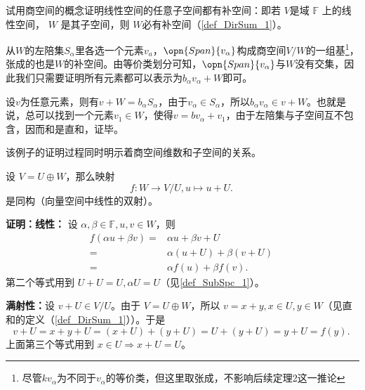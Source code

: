 \begin{example}{}%
试用商空间的概念证明线性空间的任意子空间都有补空间：即若 $V$是域 $\mathbb F$ 上的线性空间， $W$ 是其子空间，则 $W$必有补空间（\autoref{def_DirSum_1}）。

从$W$的左陪集${S_{\alpha}}$里各选一个元素$v_a$，$\opn{Span} \{v_{\alpha}\}$构成商空间$V/W$的一组基\footnote{尽管$kv_\alpha$为不同于$v_\alpha$的等价类，但这里取张成，不影响后续定理2这一推论}，张成的也是$W$的补空间。由等价类划分可知，$\opn{Span} \{v_{\alpha}\}$与$W$没有交集，因此我们只需要证明所有元素都可以表示为$b_{\alpha}v_{\alpha} + W$即可。

设$v$为任意元素，则有$v + W=b_{\alpha} S_{\alpha}$，由于$v_{\alpha} \in S_{\alpha}$，所以$b_{\alpha} v_{\alpha} \in v + W$。也就是说，总可以找到一个元素$v_1 \in W$，使得$v=bv_{\alpha} + v_1$，由于左陪集与子空间互不包含，因而和是直和，证毕。

该例子的证明过程同时明示着商空间维数和子空间的关系。
\end{example}



\begin{theorem}{}\label{the_QuoSpa_3}
设 $V=U\oplus W$，那么映射 
\begin{equation}
f:W\rightarrow V/U, u\mapsto u+U.~  
\end{equation}
是同构（向量空间中线性的双射）。
\end{theorem}

\textbf{证明：}\textbf{线性：} 设 $\alpha,\beta\in\mathbb F,u,v\in W$，则
\begin{equation}
\begin{aligned}
f(\alpha u+\beta v)=&\alpha u+\beta v+U\\
=&\alpha (u+U)+\beta(v+U)\\
=&\alpha f(u)+\beta f(v).
\end{aligned}~
\end{equation}
第二个等式用到 $U+U=U,\alpha U=U$（见\autoref{def_SubSpc_1}）。 

\textbf{满射性：}设 $v+U\in V/U$。由于 $V=U\oplus W$，所以 $v=x+y,x\in U,y\in W$（见直和的定义（\autoref{def_DirSum_1}））。于是
\begin{equation}
v+U=x+y+U=(x+U)+(y+U)=U+(y+U)=y+U=f(y).~
\end{equation}
上面第三个等式用到 $x\in U\Rightarrow x+U=U$。

